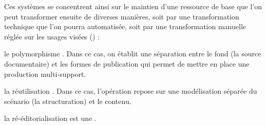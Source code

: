 Ces systèmes se concentrent ainsi sur le maintien d'une ressource de base que l'on peut transformer ensuite de diverses manières, soit par une transformation technique que l'on pourra automatisée, soit par une transformation manuelle réglée sur les usages visées (\cite{Crozat2011}) : 
\begin{liste}
	\item le polymorphisme . Dans ce cas, on établit une séparation entre le fond (la source documentaire) et les formes de publication qui permet de mettre en place une production multi-support.

	\item la réutilisation . Dans ce cas, l'opération repose sur une modélisation séparée du scénario (la structuration) et le contenu.

	\item la ré-éditorialisation est une .

\end{liste}

